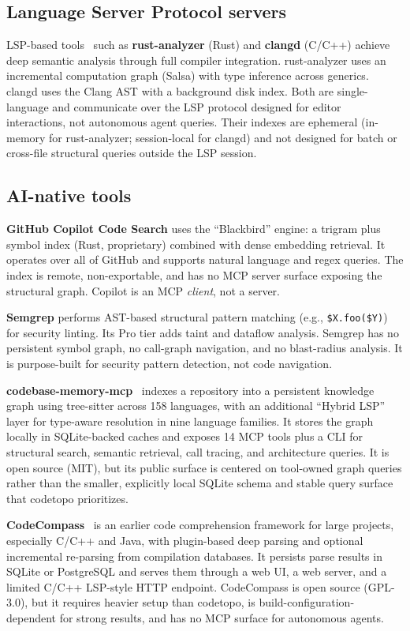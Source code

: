 \subsection{Language Server Protocol servers}

LSP-based tools~\cite{microsoft2016lsp} such as \textbf{rust-analyzer} (Rust)
and \textbf{clangd} (C/C++) achieve deep semantic analysis through full
compiler integration. rust-analyzer uses an incremental computation graph
(Salsa) with type inference across generics. clangd uses the Clang AST with a
background disk index. Both are single-language and communicate over the LSP
protocol designed for editor interactions, not autonomous agent queries. Their
indexes are ephemeral (in-memory for rust-analyzer; session-local for clangd)
and not designed for batch or cross-file structural queries outside the LSP
session.

\subsection{AI-native tools}

\textbf{GitHub Copilot Code Search} uses the ``Blackbird'' engine: a trigram
plus symbol index (Rust, proprietary) combined with dense embedding retrieval.
It operates over all of GitHub and supports natural language and regex queries.
The index is remote, non-exportable, and has no MCP server surface exposing
the structural graph. Copilot is an MCP \emph{client}, not a server.

\textbf{Semgrep} performs AST-based structural pattern matching (e.g.,
\texttt{\$X.foo(\$Y)}) for security linting. Its Pro tier adds taint and
dataflow analysis. Semgrep has no persistent symbol graph, no call-graph
navigation, and no blast-radius analysis. It is purpose-built for security
pattern detection, not code navigation.

\textbf{codebase-memory-mcp}~\cite{deusdata2026codebasememory} indexes a
repository into a persistent knowledge graph using tree-sitter across 158
languages, with an additional ``Hybrid LSP'' layer for type-aware resolution in
nine language families. It stores the graph locally in SQLite-backed caches and
exposes 14 MCP tools plus a CLI for structural search, semantic retrieval, call
tracing, and architecture queries. It is open source (MIT), but its public
surface is centered on tool-owned graph queries rather than the smaller,
explicitly local SQLite schema and stable query surface that codetopo
prioritizes.

\textbf{CodeCompass}~\cite{ericsson2016codecompass} is an earlier code
comprehension framework for large projects, especially C/C++ and Java, with
plugin-based deep parsing and optional incremental re-parsing from compilation
databases. It persists parse results in SQLite or PostgreSQL and serves them
through a web UI, a web server, and a limited C/C++ LSP-style HTTP endpoint.
CodeCompass is open source (GPL-3.0), but it requires heavier setup than
codetopo, is build-configuration-dependent for strong results, and has no MCP
surface for autonomous agents.

